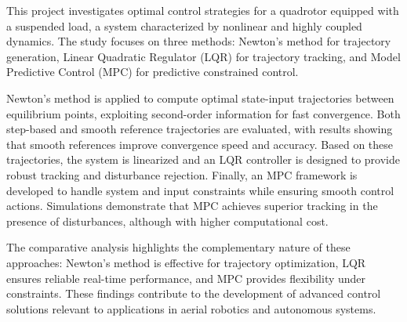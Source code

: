 \documentclass[a4paper,11pt,oneside]{book}
\begin{document}
\begin{justify}
    
    This project investigates optimal control strategies for a quadrotor equipped with a suspended load, a system characterized by nonlinear and highly coupled dynamics. The study focuses on three methods: Newton’s method for trajectory generation, Linear Quadratic Regulator (LQR) for trajectory tracking, and Model Predictive Control (MPC) for predictive constrained control.
    
    Newton’s method is applied to compute optimal state-input trajectories between equilibrium points, exploiting second-order information for fast convergence. Both step-based and smooth reference trajectories are evaluated, with results showing that smooth references improve convergence speed and accuracy. Based on these trajectories, the system is linearized and an LQR controller is designed to provide robust tracking and disturbance rejection. Finally, an MPC framework is developed to handle system and input constraints while ensuring smooth control actions. Simulations demonstrate that MPC achieves superior tracking in the presence of disturbances, although with higher computational cost.
    
    The comparative analysis highlights the complementary nature of these approaches: Newton’s method is effective for trajectory optimization, LQR ensures reliable real-time performance, and MPC provides flexibility under constraints. These findings contribute to the development of advanced control solutions relevant to applications in aerial robotics and autonomous systems.

\end{justify}

\tableofcontents \thispagestyle{empty}

\end{document}
